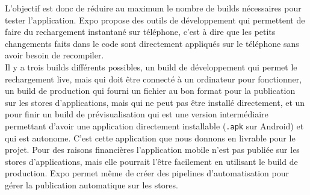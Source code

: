 \noindent L'objectif est donc de réduire au maximum le nombre de builds nécessaires pour tester l'application. Expo propose des outils de développement qui permettent de faire du rechargement instantané sur téléphone, c'est à dire que les petits changements faits dans le code sont directement appliqués sur le téléphone sans avoir besoin de recompiler.\\

\noindent Il y a trois builds différents possibles, un build de développement qui permet le rechargement live, mais qui doit être connecté à un ordinateur pour fonctionner, un build de production qui fourni un fichier au bon format pour la publication sur les stores d'applications, mais qui ne peut pas être installé directement, et un pour finir un build de prévisualisation qui est une version intermédiaire permettant d'avoir une application directement installable (\texttt{.apk} sur Android) et qui est autonome. C'est cette application que nous donnons en livrable pour le projet. Pour des raisons financières l'application mobile n'est pas publiée sur les stores d'applications, mais elle pourrait l'être facilement en utilisant le build de production. Expo permet même de créer des pipelines d'automatisation pour gérer la publication automatique sur les stores.\\
